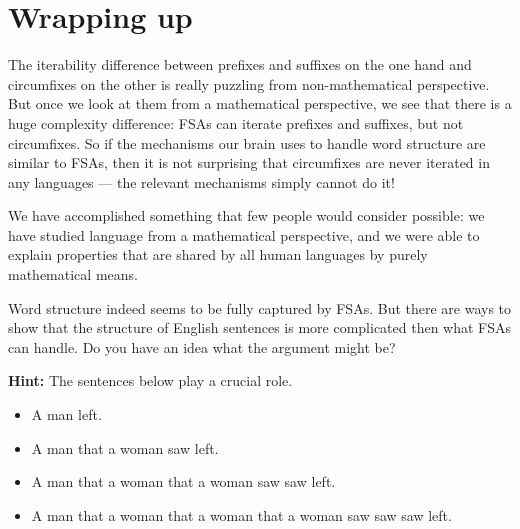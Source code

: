 \section{Wrapping up}

The iterability difference between prefixes and suffixes on the one hand and circumfixes on the other is really puzzling from non-mathematical perspective.
But once we look at them from a mathematical perspective, we see that there is a huge complexity difference: FSAs can iterate prefixes and suffixes, but not circumfixes.
So if the mechanisms our brain uses to handle word structure are similar to FSAs, then it is not surprising that circumfixes are never iterated in any languages --- the relevant mechanisms simply cannot do it!

We have accomplished something that few people would consider possible: we have studied language from a mathematical perspective, and we were able to explain properties that are shared by all human languages by purely mathematical means.

\bigskip
{}

\bigskip
\begin{homework}
    Word structure indeed seems to be fully captured by FSAs.
    But there are ways to show that the structure of English sentences is more complicated then what FSAs can handle.
    Do you have an idea what the argument might be?
    
    \smallskip
    \textbf{Hint:} The sentences below play a crucial role.
        \begin{itemize}
            \item A man left.
            \item A man that a woman saw left.
            \item A man that a woman that a woman saw saw left.
            \item A man that a woman that a woman that a woman saw saw saw left.
        \end{itemize}
\end{homework}
